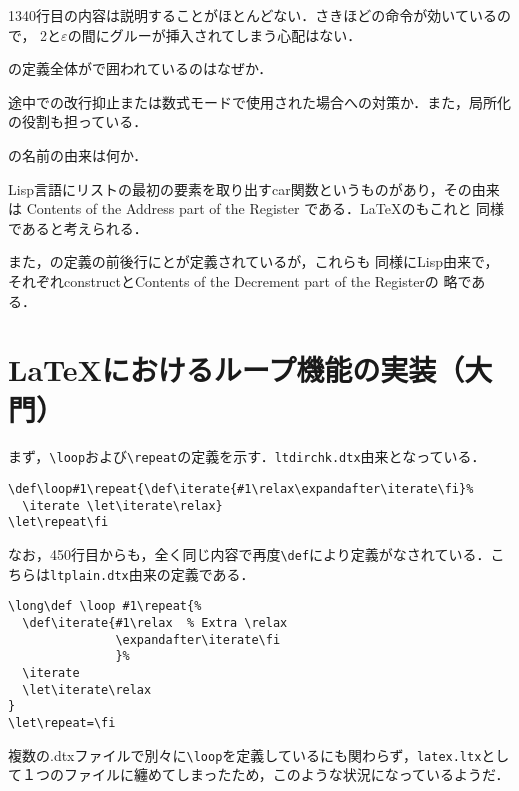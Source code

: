 \documentclass[autodetect-engine,dvipdfmx]{jsarticle}
\begin{document}
1340行目の内容は説明することがほとんどない．さきほどの命令が効いているので，
2と$\textstyle\varepsilon$の間にグルーが挿入されてしまう心配はない．

\begin{question}
の定義全体がで囲われているのはなぜか．
\end{question}
\begin{answer}
途中での改行抑止または数式モードで使用された場合への対策か．また，局所化の役割も担っている．
\end{answer}

\begin{question}
の名前の由来は何か．
\end{question}
\begin{answer}
Lisp言語にリストの最初の要素を取り出すcar関数というものがあり，その由来は
Contents of the Address part of the Register である．\LaTeX のもこれと
同様であると考えられる．

また，の定義の前後行にとが定義されているが，これらも
同様にLisp由来で，それぞれconstructとContents of the Decrement part of the Registerの
略である．
\end{answer}

\newpage

\section{\LaTeX におけるループ機能の実装（大門）}

まず，\verb|\loop|および\verb|\repeat|の定義を示す．\texttt{ltdirchk.dtx}由来となっている．

\begin{lstlisting}[firstnumber=101]
\def\loop#1\repeat{\def\iterate{#1\relax\expandafter\iterate\fi}%
  \iterate \let\iterate\relax}
\let\repeat\fi
\end{lstlisting}

なお，450行目からも，全く同じ内容で再度\verb|\def|により定義がなされている．こちらは\verb|ltplain.dtx|由来の定義である．
\begin{lstlisting}[firstnumber=450]
\long\def \loop #1\repeat{%
  \def\iterate{#1\relax  % Extra \relax
               \expandafter\iterate\fi
               }%
  \iterate
  \let\iterate\relax
}
\let\repeat=\fi
\end{lstlisting}
複数の.dtxファイルで別々に\verb|\loop|を定義しているにも関わらず，\texttt{latex.ltx}として１つのファイルに纏めてしまったため，このような状況になっているようだ．
\end{document}
